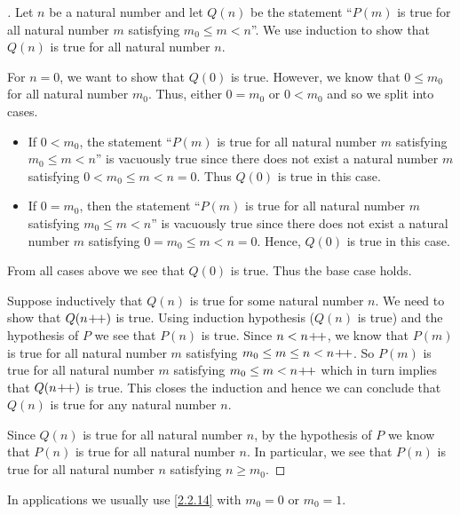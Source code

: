 \begin{proof}[]
  Let \(n\) be a natural number and let \(Q(n)\) be the statement ``\(P(m)\) is true for all natural number \(m\) satisfying \(m_0 \leq m < n\)''.
  We use induction to show that \(Q(n)\) is true for all natural number \(n\).

  For \(n = 0\), we want to show that \(Q(0)\) is true.
  However, we know that \(0 \leq m_0\) for all natural number \(m_0\).
  Thus, either \(0 = m_0\) or \(0 < m_0\) and so we split into cases.
  \begin{itemize}
    \item If \(0 < m_0\), the statement ``\(P(m)\) is true for all natural number \(m\) satisfying \(m_0 \leq m < n\)'' is vacuously true since there does not exist a natural number \(m\) satisfying \(0 < m_0 \leq m < n = 0\).
          Thus \(Q(0)\) is true in this case.
    \item If \(0 = m_0\), then the statement ``\(P(m)\) is true for all natural number \(m\) satisfying \(m_0 \leq m < n\)'' is vacuously true since there does not exist a natural number \(m\) satisfying \(0 = m_0 \leq m < n = 0\).
          Hence, \(Q(0)\) is true in this case.
  \end{itemize}
  From all cases above we see that \(Q(0)\) is true.
  Thus the base case holds.

  Suppose inductively that \(Q(n)\) is true for some natural number \(n\).
  We need to show that \(Q(n\!+\!\!+)\) is true.
  Using induction hypothesis (\(Q(n)\) is true) and the hypothesis of \(P\) we see that \(P(n)\) is true.
  Since \(n < n\!+\!\!+\), we know that \(P(m)\) is true for all natural number \(m\) satisfying \(m_0 \leq m \leq n < n\!+\!\!+\).
  So \(P(m)\) is true for all natural number \(m\) satisfying \(m_0 \leq m < n\!+\!\!+\) which in turn implies that \(Q(n\!+\!\!+)\) is true.
  This closes the induction and hence we can conclude that \(Q(n)\) is true for any natural number \(n\).

  Since \(Q(n)\) is true for all natural number \(n\), by the hypothesis of \(P\) we know that \(P(n)\) is true for all natural number \(n\).
  In particular, we see that \(P(n)\) is true for all natural number \(n\) satisfying \(n \geq m_0\).
\end{proof}

\begin{rmk}\label{2.2.15}
  In applications we usually use \cref{2.2.14} with \(m_0 = 0\) or \(m_0 = 1\).
\end{rmk}


